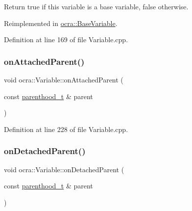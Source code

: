 Return true if this variable is a base variable, false otherwise. 

Reimplemented in \hyperlink{classocra_1_1BaseVariable_a454556cfc20026911bc687bc481ec95b}{ocra\+::\+Base\+Variable}.



Definition at line 169 of file Variable.\+cpp.

\hypertarget{classocra_1_1Variable_ab339e31cd4d90b2741154ae4795641f1}{}\label{classocra_1_1Variable_ab339e31cd4d90b2741154ae4795641f1} 
\subsubsection{\texorpdfstring{on\+Attached\+Parent()}{onAttachedParent()}}
{\footnotesize\ttfamily void ocra\+::\+Variable\+::on\+Attached\+Parent (\begin{DoxyParamCaption}\item[{const \hyperlink{classocra_1_1Variable_a88444b2124cf5aab069f46734822f31f}{parenthood\+\_\+t} \&}]{parent }\end{DoxyParamCaption})\hspace{0.3cm}{\ttfamily [protected]}}



Definition at line 228 of file Variable.\+cpp.

\hypertarget{classocra_1_1Variable_a95c1891e66fcf6122c444095e7dd4c44}{}\label{classocra_1_1Variable_a95c1891e66fcf6122c444095e7dd4c44} 
\subsubsection{\texorpdfstring{on\+Detached\+Parent()}{onDetachedParent()}}
{\footnotesize\ttfamily void ocra\+::\+Variable\+::on\+Detached\+Parent (\begin{DoxyParamCaption}\item[{const \hyperlink{classocra_1_1Variable_a88444b2124cf5aab069f46734822f31f}{parenthood\+\_\+t} \&}]{parent }\end{DoxyParamCaption})\hspace{0.3cm}{\ttfamily [protected]}}



